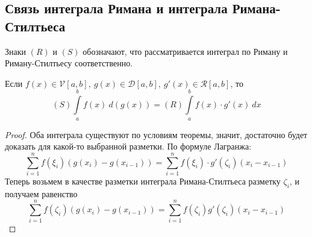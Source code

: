 \subsection{Связь интеграла Римана и интеграла Римана-Стилтьеса}
Знаки $(R)$ и $(S)$ обозначают, что рассматривается интеграл по Риману и Риману-Стилтьесу соответственно.
\begin{theorem}
    Если $f(x)\in \mathcal{V}[a,b],\ g(x)\in \mathcal{D}[a,b],\ g'(x)\in \mathcal{R}[a,b]$, то
    \[(S)\int\limits_{a}^{b}f(x)\ d(g(x))=(R)\int\limits_{a}^{b}f(x)\cdot g'(x)\ dx\]
\end{theorem} 
\begin{proof}
    Оба интеграла существуют по условиям теоремы, значит, достаточно будет доказать для какой-то выбранной разметки. По формуле Лагранжа:
    \[\sum\limits_{i=1}^{n}f(\xi_i)(g(x_i)-g(x_{i-1}))=\sum\limits_{i=1}^{n}f(\xi_i)\cdot g'(\zeta_i)(x_i-x_{i-1})\]
    Теперь возьмем в качестве разметки интеграла Римана-Стилтьеса разметку $\zeta_i$, и получаем равенство
    \[\sum\limits_{i=1}^{n}f(\zeta_i)(g(x_i)-g(x_{i-1}))=\sum\limits_{i=1}^{n}f(\zeta_i)g'(\zeta_i)(x_i-x_{i-1})\]
\end{proof} 
